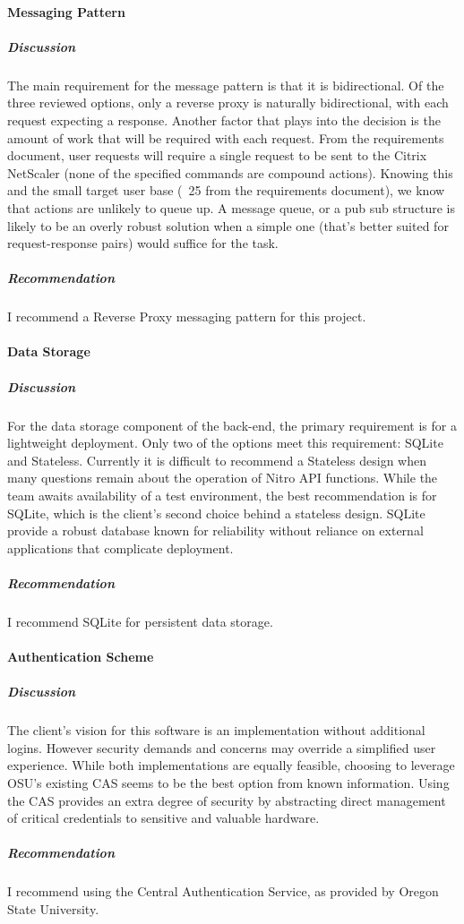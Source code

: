 \paragraph{Messaging Pattern}
\subparagraph{Discussion}
The main requirement for the message pattern is that it is bidirectional.
Of the three reviewed options, only a reverse proxy is naturally bidirectional, with each request expecting a response.
Another factor that plays into the decision is the amount of work that will be required with each request.
From the requirements document, user requests will require a single request to be sent to the Citrix NetScaler (none of the specified commands are compound actions).
Knowing this and the small target user base (~25 from the requirements document), we know that actions are unlikely to queue up.
A message queue, or a pub sub structure is likely to be an overly robust solution when a simple one (that's better suited for request-response pairs) would suffice for the task.
\subparagraph{Recommendation}
I recommend a Reverse Proxy messaging pattern for this project.

\paragraph{Data Storage}
\subparagraph{Discussion}
For the data storage component of the back-end, the primary requirement is for a lightweight deployment.
Only two of the options meet this requirement: SQLite and Stateless.
Currently it is difficult to recommend a Stateless design when many questions remain about the operation of Nitro API functions.
While the team awaits availability of a test environment, the best recommendation is for SQLite, which is the client's second choice behind a stateless design.
SQLite provide a robust database known for reliability without reliance on external applications that complicate deployment.

\subparagraph{Recommendation}
I recommend SQLite for persistent data storage.

\paragraph{Authentication Scheme}
\subparagraph{Discussion}
The client's vision for this software is an implementation without additional logins.
However security demands and concerns may override a simplified user experience.
While both implementations are equally feasible, choosing to leverage OSU's existing CAS seems to be the best option from known information.
Using the CAS provides an extra degree of security by abstracting direct management of critical credentials to sensitive and valuable hardware.

\subparagraph{Recommendation}
I recommend using the Central Authentication Service, as provided by Oregon State University.